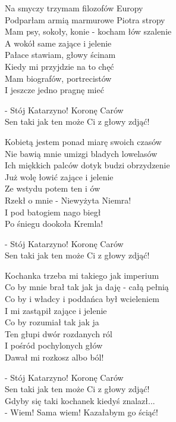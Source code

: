 \begin{text}
	Na smyczy trzymam filozofów Europy\\
	Podparłam armią marmurowe Piotra stropy\\
	Mam psy, sokoły, konie - kocham łów szalenie\\
	A wokół same zające i jelenie\\
	Pałace stawiam, głowy ścinam\\
	Kiedy mi przyjdzie na to chęć\\
	Mam biografów, portrecistów\\
	I jeszcze jedno pragnę mieć

	\vin - Stój Katarzyno! Koronę Carów\\
	\vin Sen taki jak ten może Ci z głowy zdjąć!

	Kobietą jestem ponad miarę swoich czasów\\
	Nie bawią mnie umizgi bladych lowelasów\\
	Ich miękkich palców dotyk budzi obrzydzenie\\
	Już wolę łowić zające i jelenie\\
	Ze wstydu potem ten i ów\\
	Rzekł o mnie - Niewyżyta Niemra!\\
	I pod batogiem nago biegł\\
	Po śniegu dookoła Kremla!

	\vin - Stój Katarzyno! Koronę Carów\\
	\vin Sen taki jak ten może Ci z głowy zdjąć!

	Kochanka trzeba mi takiego jak imperium\\
	Co by mnie brał tak jak ja daję - całą pełnią\\
	Co by i władcy i poddańca był wcieleniem\\
	I mi zastąpił zające i jelenie\\
	Co by rozumiał tak jak ja\\
	Ten głupi dwór rozdanych ról\\
	I pośród pochylonych głów\\
	Dawał mi rozkosz albo ból!

	\vin - Stój Katarzyno! Koronę Carów\\
	\vin Sen taki jak ten może Ci z głowy zdjąć!\\
	\vin Gdyby się taki kochanek kiedyś znalazł...\\
	\vin - Wiem! Sama wiem! Kazałabym go ściąć!
\end{text}
